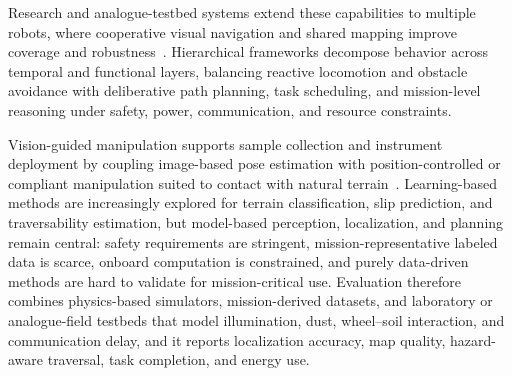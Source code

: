 Research and analogue-testbed systems extend these capabilities to multiple robots, where cooperative visual navigation and shared mapping improve coverage and robustness~\cite{bahraini2021autonomousplanetaryrobots}.
Hierarchical frameworks decompose behavior across temporal and functional layers, balancing reactive locomotion and obstacle avoidance with deliberative path planning, task scheduling, and mission-level reasoning under safety, power, communication, and resource constraints.

Vision-guided manipulation supports sample collection and instrument deployment by coupling image-based pose estimation with position-controlled or compliant manipulation suited to contact with natural terrain~\cite{nickels2010visionplanetaryrobotics}.
Learning-based methods are increasingly explored for terrain classification, slip prediction, and traversability estimation, but model-based perception, localization, and planning remain central: safety requirements are stringent, mission-representative labeled data is scarce, onboard computation is constrained, and purely data-driven methods are hard to validate for mission-critical use.
Evaluation therefore combines physics-based simulators, mission-derived datasets, and laboratory or analogue-field testbeds that model illumination, dust, wheel--soil interaction, and communication delay, and it reports localization accuracy, map quality, hazard-aware traversal, task completion, and energy use.

